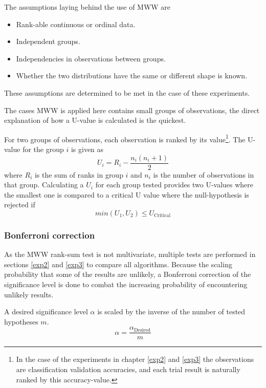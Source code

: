 The assumptions laying behind the use of MWW are 
\begin{itemize}
    \item Rank-able continuous or ordinal data.
    \item Independent groups.
    \item Independencies in observations between groups.
    \item Whether the two distributions have the same or different shape is known. 
\end{itemize}
These assumptions are determined to be met in the case of these experiments. 

The cases MWW is applied here contains small groups of observations, the direct explanation of how a U-value is calculated is the quickest. 

For two groups of observations, each observation is ranked by its value\footnote{In the case of the experiments in chapter \ref{exp2} and \ref{exp3} the observations are classification validation accuracies, and each trial result is naturally ranked by this accuracy-value.}. The U-value for the group \(i\) is given as 
\begin{equation*}
    U_{i} = R_{i}-\frac{n_{i}(n_{i}+1)}{2}
\end{equation*}
where \(R_{i}\) is the sum of ranks in group \(i\) and \(n_{i}\) is the number of observations in that group. 
Calculating a \(U_{i}\) for each group tested provides two U-values where the smallest one is compared to a critical U value where the null-hypothesis is rejected if 
\begin{equation*}
    min(U_{1}, U_{2}) \leq U_{\text{Critical}}
\end{equation*}

\subsubsection{Bonferroni correction}
As the MWW rank-sum test is not multivariate, multiple tests are performed in sections \ref{exp2} and \ref{exp3} to compare all algorithms. Because the scaling probability that some of the results are unlikely, a Bonferroni correction of the significance level is done to combat the increasing probability of encountering unlikely results. 

A desired significance level \(\alpha\) is scaled by the inverse of the number of tested hypotheses \(m\). 
\begin{equation*}
    \alpha=\frac{\alpha_{\text{Desired}}}{m}
\end{equation*}

